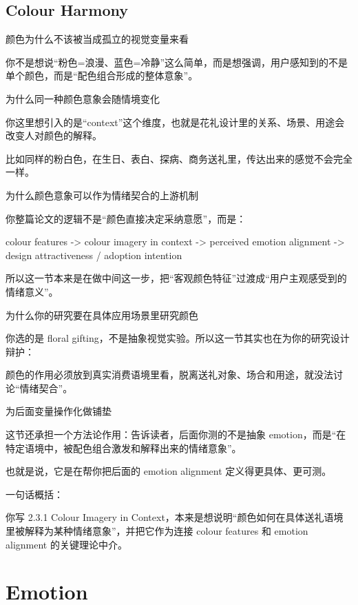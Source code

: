 
\subsection{Colour Harmony}

颜色为什么不该被当成孤立的视觉变量来看

你不是想说“粉色=浪漫、蓝色=冷静”这么简单，而是想强调，用户感知到的不是单个颜色，而是“配色组合形成的整体意象”。

为什么同一种颜色意象会随情境变化

你这里想引入的是“context”这个维度，也就是花礼设计里的关系、场景、用途会改变人对颜色的解释。

比如同样的粉白色，在生日、表白、探病、商务送礼里，传达出来的感觉不会完全一样。

为什么颜色意象可以作为情绪契合的上游机制

你整篇论文的逻辑不是“颜色直接决定采纳意愿”，而是：

colour features -> colour imagery in context -> perceived emotion alignment -> design attractiveness / adoption intention

所以这一节本来是在做中间这一步，把“客观颜色特征”过渡成“用户主观感受到的情绪意义”。

为什么你的研究要在具体应用场景里研究颜色

你选的是 floral gifting，不是抽象视觉实验。所以这一节其实也在为你的研究设计辩护：

颜色的作用必须放到真实消费语境里看，脱离送礼对象、场合和用途，就没法讨论“情绪契合”。

为后面变量操作化做铺垫

这节还承担一个方法论作用：告诉读者，后面你测的不是抽象 emotion，而是“在特定语境中，被配色组合激发和解释出来的情绪意象”。

也就是说，它是在帮你把后面的 emotion alignment 定义得更具体、更可测。

一句话概括：

你写 2.3.1 Colour Imagery in Context，本来是想说明“颜色如何在具体送礼语境里被解释为某种情绪意象”，并把它作为连接 colour features 和 emotion alignment 的关键理论中介。

\section{Emotion}

